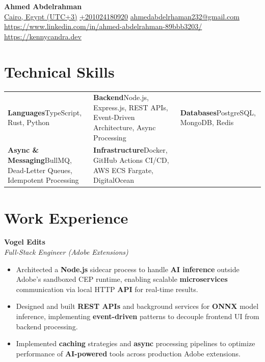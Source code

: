 \documentclass[10pt, a4paper]{article}
\begin{document}
\begin{center}
  {\LARGE\bfseries\color{primary} Ahmed Abdelrahman}\\[6pt]
  {\small\color{subtle} \href{Cairo, Egypt (UTC+3)}{Cairo, Egypt (UTC+3)} \;\textcolor{divider}{\textbar{}}\; \href{+201024180920}{+201024180920} \;\textcolor{divider}{\textbar{}}\; \href{ahmedabdelrhaman232@gmail.com}{ahmedabdelrhaman232@gmail.com} \;\textcolor{divider}{\textbar{}}\; \href{https://www.linkedin.com/in/ahmed-abdelrahman-89bbb3203/}{https://www.linkedin.com/in/ahmed-abdelrahman-89bbb3203/} \;\textcolor{divider}{\textbar{}}\; \href{https://kennycandra.dev}{https://kennycandra.dev}}
\end{center}

\vspace{-4pt}

\section{Technical Skills}
\begin{tabularx}{\textwidth}{X X X}
\textbf{Languages}\newline TypeScript, Rust, Python & \textbf{Backend}\newline Node.js, Express.js, REST APIs, Event-Driven Architecture, Async Processing & \textbf{Databases}\newline PostgreSQL, MongoDB, Redis \\[4pt]
\textbf{Async \& Messaging}\newline BullMQ, Dead-Letter Queues, Idempotent Processing & \textbf{Infrastructure}\newline Docker, GitHub Actions CI/CD, AWS ECS Fargate, DigitalOcean &   \\[4pt]
\end{tabularx}

\section{Work Experience}
\textbf{Vogel Edits} \\
{\textit{\textcolor{subtle}{Full-Stack Engineer (Adobe Extensions)}}}\\\begin{itemize}
\item Architected a \textbf{Node.js} sidecar process to handle \textbf{AI inference} outside Adobe's sandboxed CEP runtime, enabling scalable \textbf{microservices} communication via local HTTP \textbf{API} for real-time results.
\item Designed and built \textbf{REST APIs} and background services for \textbf{ONNX} model inference, implementing \textbf{event-driven} patterns to decouple frontend UI from backend processing.
\item Implemented \textbf{caching} strategies and \textbf{async} processing pipelines to optimize performance of \textbf{AI-powered} tools across production Adobe extensions.
\end{itemize}
\end{document}
